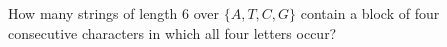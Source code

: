 How many strings of length 6 over $\{A,T,C,G\}$ contain a block of four consecutive characters in which all four letters occur?
